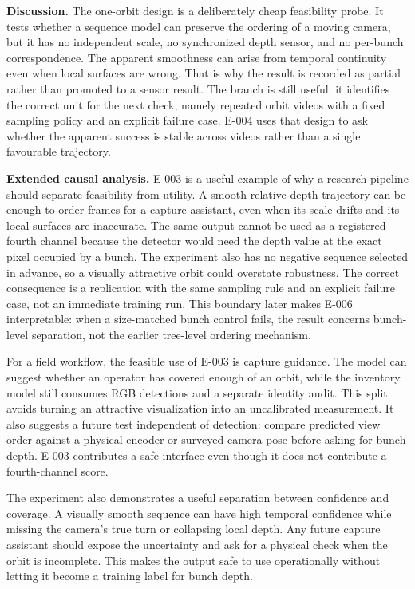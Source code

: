 \documentclass[preprint,12pt]{elsarticle}
\begin{document}
\textbf{Discussion.} The one-orbit design is a deliberately cheap feasibility
probe. It tests whether a sequence model can preserve the ordering of a
moving camera, but it has no independent scale, no synchronized depth sensor,
and no per-bunch correspondence. The apparent smoothness can arise from
temporal continuity even when local surfaces are wrong. That is why the result
is recorded as partial rather than promoted to a sensor result. The branch is
still useful: it identifies the correct unit for the next check, namely
repeated orbit videos with a fixed sampling policy and an explicit failure
case. E-004 uses that design to ask whether the apparent success is stable
across videos rather than a single favourable trajectory.

\textbf{Extended causal analysis.} E-003 is a useful example of why a
research pipeline should separate feasibility from utility. A smooth relative
depth trajectory can be enough to order frames for a capture assistant, even
when its scale drifts and its local surfaces are inaccurate. The same output
cannot be used as a registered fourth channel because the detector would need
the depth value at the exact pixel occupied by a bunch. The experiment also
has no negative sequence selected in advance, so a visually attractive orbit
could overstate robustness. The correct consequence is a replication with the
same sampling rule and an explicit failure case, not an immediate training
run. This boundary later makes E-006 interpretable: when a size-matched bunch
control fails, the result concerns bunch-level separation, not the earlier
tree-level ordering mechanism.

For a field workflow, the feasible use of E-003 is capture guidance. The model
can suggest whether an operator has covered enough of an orbit, while the
inventory model still consumes RGB detections and a separate identity audit.
This split avoids turning an attractive visualization into an uncalibrated
measurement. It also suggests a future test independent of detection: compare
predicted view order against a physical encoder or surveyed camera pose before
asking for bunch depth. E-003 contributes a safe interface even though it does
not contribute a fourth-channel score.

The experiment also demonstrates a useful separation between confidence and
coverage. A visually smooth sequence can have high temporal confidence while
missing the camera's true turn or collapsing local depth. Any future capture
assistant should expose the uncertainty and ask for a physical check when the
orbit is incomplete. This makes the output safe to use operationally without
letting it become a training label for bunch depth.
\end{document}
